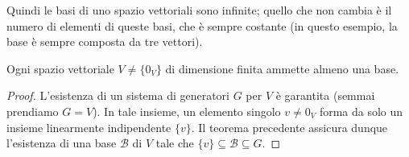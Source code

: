 Quindi le basi di uno spazio vettoriali sono infinite; quello che non cambia è il numero di elementi di queste basi, che è sempre costante (in questo esempio, la base è sempre composta da tre vettori).
\begin{corollario}
	Ogni spazio vettoriale $V\neq\{0_V\}$ di dimensione finita ammette almeno una base.
\end{corollario}
\begin{proof}
	L'esistenza di un sistema di generatori $G$ per $V$ è garantita (semmai prendiamo $G=V$).
	In tale insieme, un elemento singolo $v\ne 0_V$ forma da solo un insieme linearmente indipendente $\{v\}$.
	Il teorema precedente assicura dunque l'esistenza di una base $\mathcal B$ di $V$ tale che $\{v\}\subseteq\mathcal B\subseteq G$.
\end{proof}

